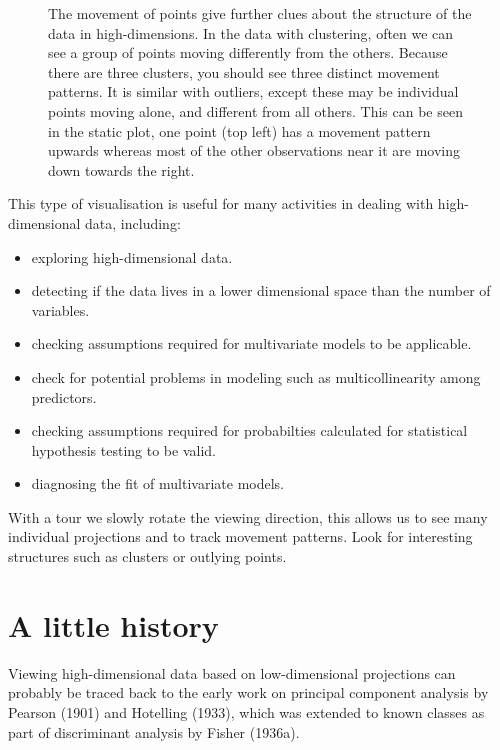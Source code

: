 \documentclass[
  letterpaper,
]{book}
\providecommand{\tightlist}{%
  \setlength{\itemsep}{0pt}\setlength{\parskip}{0pt}}\usepackage{longtable,booktabs,array}
\begin{document}
\begin{figure}
\begin{minipage}[t]{0.50\linewidth}
{{}

}

\end{minipage}%

\caption{\label{fig-trails}The movement of points give further clues
about the structure of the data in high-dimensions. In the data with
clustering, often we can see a group of points moving differently from
the others. Because there are three clusters, you should see three
distinct movement patterns. It is similar with outliers, except these
may be individual points moving alone, and different from all others.
This can be seen in the static plot, one point (top left) has a movement
pattern upwards whereas most of the other observations near it are
moving down towards the right.}

\end{figure}

This type of visualisation is useful for many activities in dealing with
high-dimensional data, including:

\begin{itemize}
\tightlist
\item
  exploring high-dimensional data.
\item
  detecting if the data lives in a lower dimensional space than the
  number of variables.
\item
  checking assumptions required for multivariate models to be
  applicable.
\item
  check for potential problems in modeling such as multicollinearity
  among predictors.
\item
  checking assumptions required for probabilties calculated for
  statistical hypothesis testing to be valid.
\item
  diagnosing the fit of multivariate models.
\end{itemize}

With a tour we slowly rotate the viewing direction, this allows us to
see many individual projections and to track movement patterns. Look for
interesting structures such as clusters or outlying points.

\hypertarget{a-little-history}{%
\section{A little history}\label{a-little-history}}

Viewing high-dimensional data based on low-dimensional projections can
probably be traced back to the early work on principal component
analysis by Pearson (1901) and Hotelling (1933), which was extended to
known classes as part of discriminant analysis by Fisher (1936a).
\end{document}

